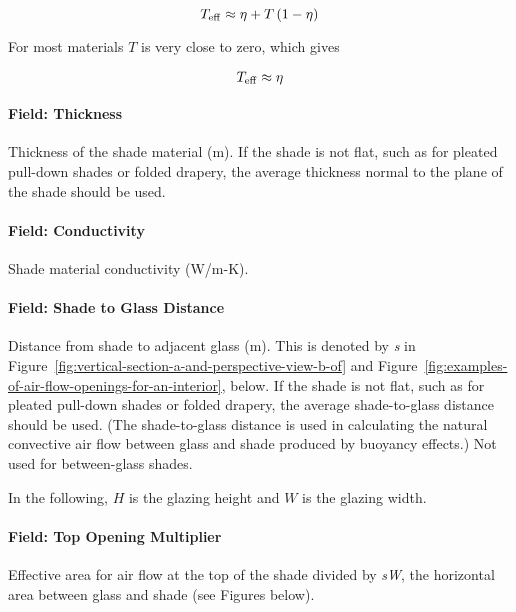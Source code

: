 \begin{equation}
T_{\rm{eff}} \approx \eta + T \left( 1 - \eta \right)
\end{equation}

For most materials \(T\) is very close to zero, which gives

\begin{equation}
T_{\rm{eff}} \approx \eta
\end{equation}

\paragraph{Field: Thickness}\label{field-thickness-6}

Thickness of the shade material (m). If the shade is not flat, such as for pleated pull-down shades or folded drapery, the average thickness normal to the plane of the shade should be used.

\paragraph{Field: Conductivity}\label{field-conductivity-3}

Shade material conductivity (W/m-K).

\paragraph{Field: Shade to Glass Distance}\label{field-shade-to-glass-distance}

Distance from shade to adjacent glass (m). This is denoted by \emph{s} in Figure~\ref{fig:vertical-section-a-and-perspective-view-b-of} and Figure~\ref{fig:examples-of-air-flow-openings-for-an-interior}, below. If the shade is not flat, such as for pleated pull-down shades or folded drapery, the average shade-to-glass distance should be used. (The shade-to-glass distance is used in calculating the natural convective air flow between glass and shade produced by buoyancy effects.) Not used for between-glass shades.

In the following, $H$ is the glazing height and $W$ is the glazing width.

\paragraph{Field: Top Opening Multiplier}\label{field-top-opening-multiplier}

Effective area for air flow at the top of the shade divided by \emph{sW}, the horizontal area between glass and shade (see Figures below).

